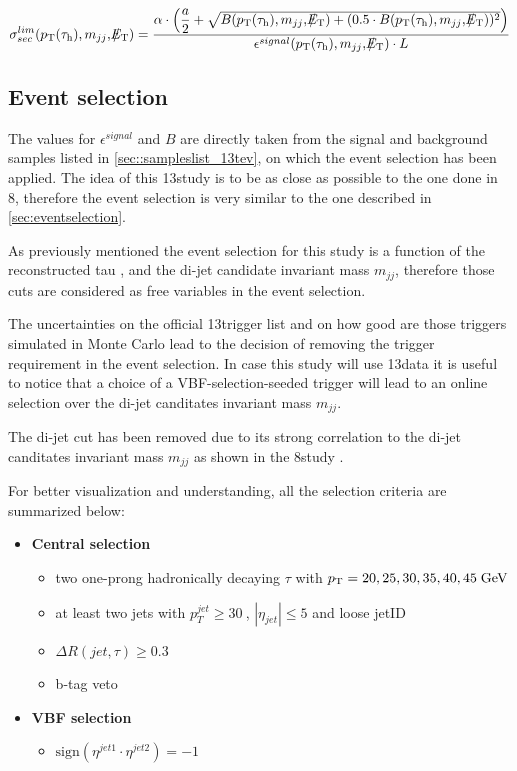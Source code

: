 \begin{equation}
\sigma^{lim}_{sec}( \pt(\hadtau) , m_{jj} ,  \met ) = \dfrac{\alpha \cdot\left(\dfrac{a}{2} + \sqrt{B( \pt(\hadtau) , m_{jj} ,  \met ) + (0.5 \cdot B( \pt(\hadtau) , m_{jj} ,  \met ))^{2}}\right)}{\epsilon^{signal} ( \pt(\hadtau) , m_{jj} ,  \met ) \cdot L}
\label{eq::xsec_lim}
\end{equation}



\subsection{Event selection}
\label{subsec::event_sel_13tev}

The values for $\epsilon^{signal}$ and $B$ are directly taken from the signal and background samples listed in \autoref{sec::sampleslist_13tev}, on which the event selection has been applied. The idea of this 13\tev study is to be as close as possible to the one done in 8\tev, therefore the event selection is very similar to the one described in \autoref{sec:eventselection}.

As previously mentioned the event selection for this study is a function of the reconstructed tau \pt , \met and the di-jet candidate invariant mass $m_{jj}$, therefore those cuts are considered as free variables in the event selection. 

The uncertainties on the official 13\tev trigger list and on how good are those triggers simulated in Monte Carlo lead to the decision of removing the trigger requirement in the event selection. In case this study will use 13\tev data it is useful to notice that a choice of a VBF-selection-seeded trigger will lead to an online selection over the di-jet canditates invariant mass $m_{jj}$.

The di-jet \deltaeta cut has been removed due to its strong correlation to the di-jet canditates invariant mass $m_{jj}$ as shown in the 8\tev study \cite{Khachatryan:2015kxa}.

For better visualization and understanding, all the selection criteria are summarized below:

\begin{itemize}
	\item \textbf{Central selection}
	\begin{itemize}
		\item two one-prong hadronically decaying $\tau$ with $p_{\text{T}} = 20,25,30,35,40,45\;\text{Ge}\kern-0.06667em\text{V}$
		\item at least two jets with $p_{T}^{jet}\geq30~$\gev, $|\eta_{jet}|\leq5$ and loose jetID
		\item $\Delta R(jet,\tau)\geq0.3$
		\item b-tag veto
	\end{itemize}
	\item \textbf{VBF selection}
	\begin{itemize}
		\item $\text{sign}(\eta^{jet 1}\cdot\eta^{jet 2})=-1$
	\end{itemize}
\end{itemize}


